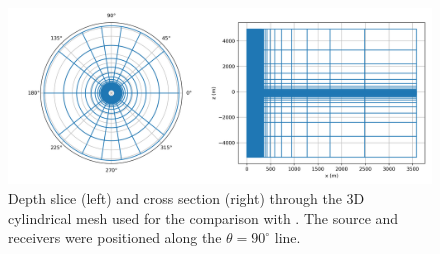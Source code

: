 \begin{figure}
    \begin{center}
    \includegraphics[width=\columnwidth]{figures/casing_software/commer_mesh.png}
    \end{center}
\caption{Depth slice (left) and cross section (right) through the 3D cylindrical mesh used for the comparison with \cite{Commer2015}. The source and receivers were positioned along the $\theta = 90^\circ$ line.}
\label{fig:commer_mesh}
\end{figure}
